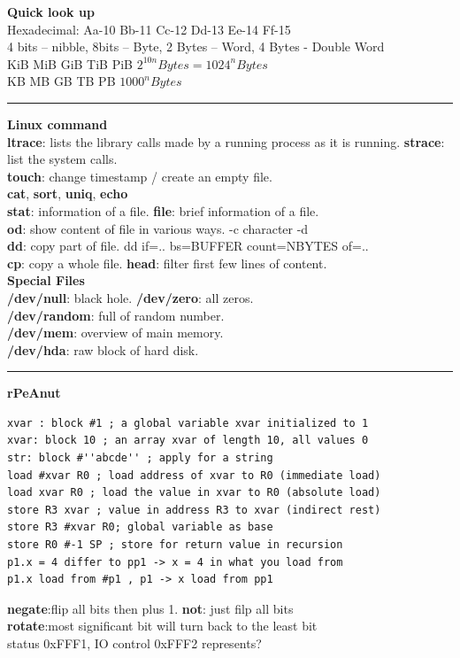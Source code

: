 \documentclass[8pt,a4paper,landscape]{article}
\newcommand{\topic}[1]{\textbf{\large #1}}
\begin{document}
\small
\begin{spacing}{-1}
\begin{multicols*}{3}
    \noindent
    \topic{Quick look up} \\
    Hexadecimal: Aa-10  Bb-11  Cc-12  Dd-13  Ee-14  Ff-15 \\
    4 bits – nibble, 8bits – Byte, 2 Bytes – Word, 4 Bytes - Double Word\\
    KiB MiB GiB TiB PiB $2^{10n} Bytes = 1024^{n} Bytes$\\
    KB MB GB TB PB  $1000^{n} Bytes$ \\
    \hrule \noindent
    \topic{Linux command} \\
    \textbf{ltrace}: lists the library calls made by a running process as it is running. 
    \textbf{strace}: list the system calls.  \\
    \textbf{touch}: change timestamp / create an empty file. \\
    \textbf{cat}, \textbf{sort}, \textbf{uniq}, \textbf{echo} \\
    \textbf{stat}: information of a file. \textbf{file}: brief information of a file.\\
    \textbf{od}: show content of file in various ways. -c character -d \\
    \textbf{dd}: copy part of file. dd if=.. bs=BUFFER count=NBYTES of=.. \\
    \textbf{cp}: copy a whole file. \textbf{head}: filter first few lines of content. \\
    \topic{Special Files} \\
    \textbf{/dev/null}: black hole. \textbf{/dev/zero}: all zeros. \\
    \textbf{/dev/random}: full of random number. \\
    \textbf{/dev/mem}: overview of main memory. \\
    \textbf{/dev/hda}: raw block of hard disk. \\
    \hrule \noindent
\vspace*{-2mm}
\topic{rPeAnut} \\
\begin{verbatim}
xvar : block #1 ; a global variable xvar initialized to 1
xvar: block 10 ; an array xvar of length 10, all values 0
str: block #''abcde'' ; apply for a string
load #xvar R0 ; load address of xvar to R0 (immediate load)
load xvar R0 ; load the value in xvar to R0 (absolute load)
store R3 xvar ; value in address R3 to xvar (indirect rest)
store R3 #xvar R0; global variable as base 
store R0 #-1 SP ; store for return value in recursion
p1.x = 4 differ to pp1 -> x = 4 in what you load from
p1.x load from #p1 , p1 -> x load from pp1  \end{verbatim}
\vspace*{-3mm}
    \textbf{negate}:flip all bits then plus 1. \textbf{not}: just filp all bits \\
    \textbf{rotate}:most significant bit will turn back to the least bit \\
    status 0xFFF1, IO control 0xFFF2 represents? \\


\end{multicols*}
\end{spacing}
\end{document}
